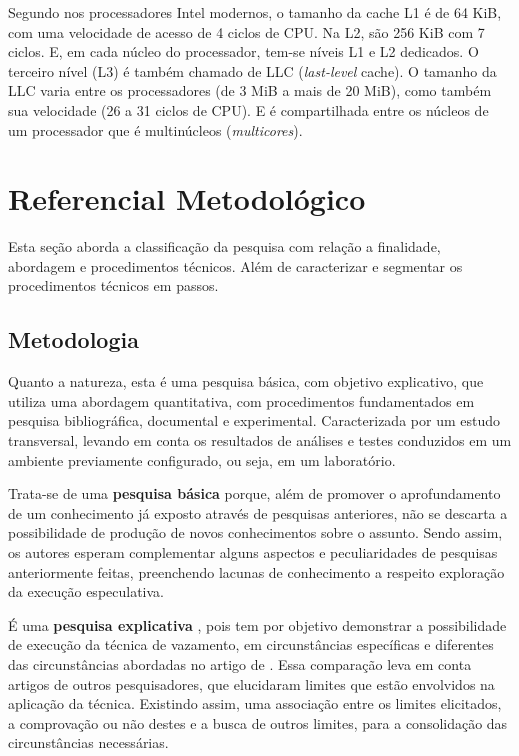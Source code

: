 \documentclass[
	article,			    %
	12pt,				    %
	oneside,			    %
	a4paper,			    %
	chapter=TITLE,		    %
	section=TITLE,		    %
	subsection=TITLE,	    %
	english,			    %
	brazil,				    %
	sumario=tradicional
]{abntex2}
\begin{document}
Segundo  nos processadores Intel modernos, o tamanho da cache L1 é de 64 KiB, com uma velocidade de acesso de 4 ciclos de CPU. Na L2, são 256 KiB com 7 ciclos. E, em cada núcleo do processador, tem-se níveis L1 e L2 dedicados. O terceiro nível (L3) é também chamado de LLC (\emph{last-level} cache). O tamanho da LLC varia entre os processadores (de 3 MiB a mais de 20 MiB), como também sua velocidade (26 a 31 ciclos de CPU). E é compartilhada entre os núcleos de um processador que é multinúcleos (\emph{multicores}).

\section{Referencial Metodológico}
Esta seção aborda a classificação da pesquisa com relação a finalidade, abordagem e procedimentos técnicos. Além de caracterizar e segmentar os procedimentos técnicos em passos.
\subsection{Metodologia}
Quanto a natureza, esta é uma pesquisa básica, com objetivo explicativo, que utiliza uma abordagem quantitativa, com procedimentos fundamentados em pesquisa bibliográfica, documental e experimental. Caracterizada por um estudo transversal, levando em conta os resultados de análises e testes conduzidos em um ambiente previamente configurado, ou seja, em um laboratório.

Trata-se de uma \textbf{pesquisa básica} \cite{Priscilla2017Metodologia} porque, além de promover o aprofundamento de um conhecimento já exposto através de pesquisas anteriores, não se descarta a possibilidade de produção de novos conhecimentos sobre o assunto. Sendo assim, os autores esperam complementar alguns aspectos e peculiaridades de pesquisas anteriormente feitas, preenchendo lacunas de conhecimento a respeito exploração da execução especulativa.

É uma \textbf{pesquisa explicativa} \cite{Rocha2016Dom}, pois tem por objetivo demonstrar a possibilidade de execução da técnica de vazamento, em circunstâncias específicas e diferentes das circunstâncias abordadas no artigo de . Essa comparação leva em conta artigos de outros pesquisadores, que elucidaram limites que estão envolvidos na aplicação da técnica. Existindo assim, uma associação entre os limites elicitados, a comprovação ou não destes e a busca de outros limites, para a consolidação das circunstâncias necessárias.
\end{document}
